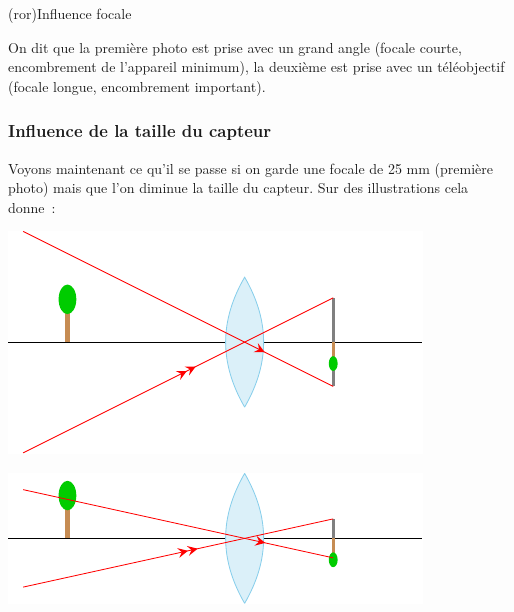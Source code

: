 \documentclass[../../main/main.tex]{subfiles}
\begin{document}
\begin{tcb*}[cnt](ror){Influence focale}
\end{tcb*}

On dit que la première photo est prise avec un grand angle (focale courte,
encombrement de l'appareil minimum), la deuxième est prise avec un téléobjectif
(focale longue, encombrement important).

\subsubsection{Influence de la taille du capteur}

Voyons maintenant ce qu'il se passe si on garde une focale de 25 mm (première
photo) mais que l'on diminue la taille du capteur. Sur des illustrations cela
donne~:

\begin{minipage}{0.49\linewidth}
	\begin{center}
		\includegraphics[scale=1]{taille_capt-a} \\
	\end{center}
\end{minipage}
\begin{minipage}{0.49\linewidth}
	\begin{center}
		\includegraphics[scale=1]{taille_capt-b} \\
	\end{center}
\end{minipage}
\end{document}
